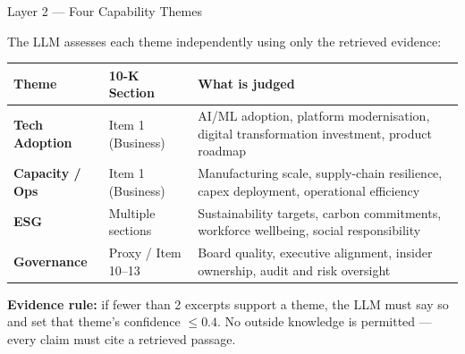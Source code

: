 \documentclass[aspectratio=169]{beamer}
\begin{document}
\begin{frame}{Layer 2 --- Four Capability Themes}
\small

The LLM assesses each theme independently using only the retrieved evidence:

\vspace{0.2cm}
\begin{table}[h]
\centering
\begin{tabular}{p{3.2cm} p{3.6cm} p{4.8cm}}
\hline
\textbf{Theme} & \textbf{10-K Section} & \textbf{What is judged} \\
\hline
\textbf{Tech Adoption} &
Item 1 (Business) &
AI/ML adoption, platform modernisation, digital transformation investment, product roadmap \\[4pt]
\textbf{Capacity / Ops} &
Item 1 (Business) &
Manufacturing scale, supply-chain resilience, capex deployment, operational efficiency \\[4pt]
\textbf{ESG} &
Multiple sections &
Sustainability targets, carbon commitments, workforce wellbeing, social responsibility \\[4pt]
\textbf{Governance} &
Proxy / Item 10--13 &
Board quality, executive alignment, insider ownership, audit and risk oversight \\
\hline
\end{tabular}
\end{table}

\vspace{0.2cm}
\textbf{Evidence rule:} if fewer than 2 excerpts support a theme, the LLM must
say so and set that theme's confidence $\leq 0.4$. No outside knowledge is
permitted --- every claim must cite a retrieved passage.

\end{frame}
\end{document}
